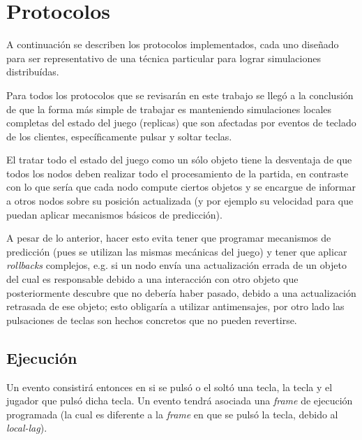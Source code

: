 \section{Protocolos}



A continuación se describen los protocolos implementados, cada uno diseñado para ser representativo de una técnica particular para lograr simulaciones distribuídas.

Para todos los protocolos que se revisarán en este trabajo se llegó a la conclusión de que la forma más simple de trabajar es manteniendo simulaciones locales completas del estado del juego (replicas) que son afectadas por eventos de teclado de los clientes, específicamente pulsar y soltar teclas.

El tratar todo el estado del juego como un sólo objeto tiene la desventaja de que todos los nodos deben realizar todo el procesamiento de la partida, en contraste con lo que sería que cada nodo compute ciertos objetos y se encargue de informar a otros nodos sobre su posición actualizada (y por ejemplo su velocidad para que puedan aplicar mecanismos básicos de predicción).


A pesar de lo anterior, hacer esto evita tener que programar mecanismos de predicción (pues se utilizan las mismas mecánicas del juego) y tener que aplicar \emph{rollbacks} complejos, e.g. si un nodo envía una actualización errada de un objeto del cual es responsable debido a una interacción con otro objeto que posteriormente descubre que no debería haber pasado, debido a una actualización retrasada de ese objeto; esto obligaría a utilizar antimensajes, por otro lado las pulsaciones de teclas son hechos concretos que no pueden revertirse.



\subsection{Ejecución}

Un evento consistirá entonces en si se pulsó o el soltó una tecla, la tecla y el jugador que pulsó dicha tecla. Un evento tendrá asociada una \emph{frame} de ejecución programada (la cual es diferente a la \emph{frame} en que se pulsó la tecla, debido al \emph{local-lag}).

